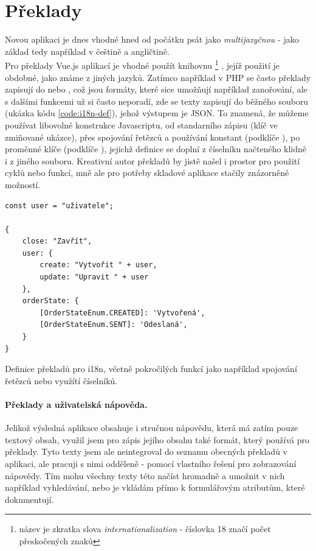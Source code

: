 
\section{Překlady}

Novou aplikaci je dnes vhodné hned od počátku psát jako \emph{multijazyčnou} - jako základ tedy například v češtině a angličtině.\\
Pro překlady Vue.js aplikací je vhodné použít knihovnu \footnote{název je zkratka slova \emph{internationalization} - číslovka 18 značí počet přeskočených znaků} \cite{vue-i18n}, jejíž použití je obdobné, jako známe z jiných jazyků. Zatímco například v PHP se často překlady zapisují do  nebo , což jsou formáty, které sice umožňují například zanořování, ale s dalšími funkcemi už si často neporadí, zde se texty zapisují do běžného  souboru (ukázka kódu \ref{code:i18n-def}), jehož výstupem je JSON. To znamená, že můžeme používat libovolné konstrukce Javascriptu, od standarního zápisu (klíč  ve zmiňované ukázce), přes spojování řetězců a používání konstant (podklíče ), po proměnné klíče (podklíče ), jejichž definice se doplní z číselníku načteného klidně i z jiného souboru. Kreativní autor překladů by jistě našel i prostor pro použití cyklů nebo funkcí, mně ale pro potřeby skladové aplikace stačily znázorněné možností.

\begin{listing}[h]
\begin{verbatim}
const user = "uživatele";

{
    close: "Zavřít",
    user: {
        create: "Vytvořit " + user,
        update: "Upravit " + user
    },
    orderState: {
        [OrderStateEnum.CREATED]: 'Vytvořená',
        [OrderStateEnum.SENT]: 'Odeslaná',
    }
}
\end{verbatim}
\caption[Definice překladů pro i18n]{Definice překladů pro i18n, včetně pokročilých funkcí jako například spojování řetězců nebo využítí číselníků.} \label{code:i18n-def}
\end{listing}

\paragraph{Překlady a uživatelská nápověda.} Jelikož výsledná aplikace obsahuje i stručnou nápovědu, která má zatím pouze textový obsah, využil jsem pro zápis jejího obsahu také formát, který používá  pro překlady. Tyto texty jsem ale neintegroval do seznamu obecných překladů v aplikaci, ale pracuji s nimi odděleně - pomocí vlastního řešení pro zobrazování nápovědy. Tím mohu všechny texty této  načíst hromadně a umožnit v nich například vyhledávání, nebo je vkládám přímo k formulářovým atributům, které dokumentují.

